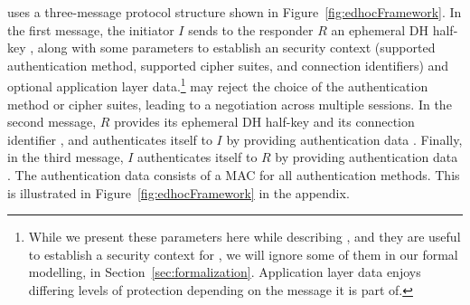 
%
\mEdhoc{} uses a three-message protocol structure
shown in Figure~\ref{fig:edhocFramework}.
%
In the first message, the initiator $I$ sends to the responder $R$ an
ephemeral DH half-key \mGx{}, along with some parameters to establish an \mOscore{} security context (supported authentication method, supported cipher suites, and connection identifiers) and optional application layer data.\footnote{While we present these parameters here while describing \mEdhoc, and they are useful to establish a security context for \mOscore, we will ignore some of them in our formal modelling, in Section~\ref{sec:formalization}. Application layer data enjoys differing levels of protection depending on the message it is part of.}  may reject the choice of the authentication method or cipher suites, leading to a negotiation across multiple \mEdhoc{} sessions.
%
In the second message, $R$ provides its ephemeral
DH half-key \mGy{} and its connection identifier \mCr, and authenticates itself
to $I$ by providing authentication data \mAuthr{}.
%
Finally, in the third message, $I$ authenticates itself
to $R$ by providing authentication data \mAuthi{}.
%
The authentication data consists of a MAC for all authentication methods.
%
This is illustrated in Figure~\ref{fig:edhocFramework} in the appendix.
%
%
%
